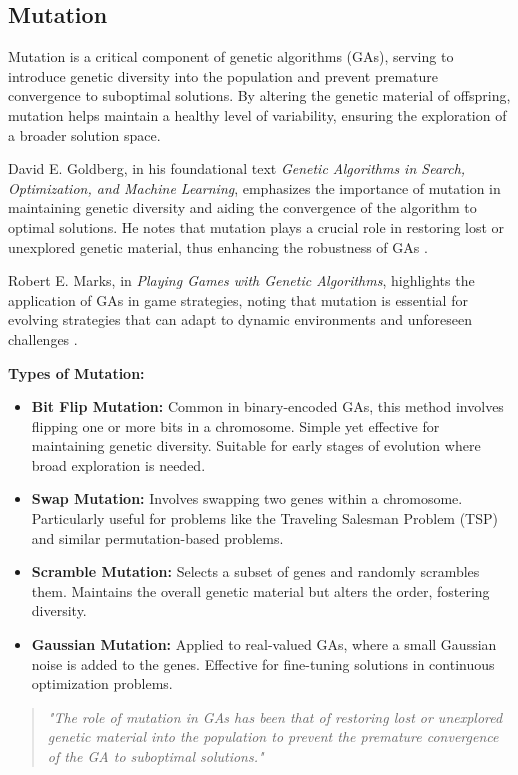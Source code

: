 \documentclass[a4paper, twocolumn]{article}
\begin{document}
\subsection{Mutation\label{sec:Mutation}}

Mutation is a critical component of genetic algorithms (GAs), serving to introduce genetic diversity into the population and prevent premature convergence to suboptimal solutions. By altering the genetic material of offspring, mutation helps maintain a healthy level of variability, ensuring the exploration of a broader solution space.

David E. Goldberg, in his foundational text \textit{Genetic Algorithms in Search, Optimization, and Machine Learning}, emphasizes the importance of mutation in maintaining genetic diversity and aiding the convergence of the algorithm to optimal solutions. He notes that mutation plays a crucial role in restoring lost or unexplored genetic material, thus enhancing the robustness of GAs \cite{goldberg1989genetic}.

Robert E. Marks, in \textit{Playing Games with Genetic Algorithms}, highlights the application of GAs in game strategies, noting that mutation is essential for evolving strategies that can adapt to dynamic environments and unforeseen challenges \cite{marks2001playing}.

\textbf{Types of Mutation:}
\begin{itemize}
    \item \textbf{Bit Flip Mutation:} Common in binary-encoded GAs, this method involves flipping one or more bits in a chromosome. Simple yet effective for maintaining genetic diversity. Suitable for early stages of evolution where broad exploration is needed.
    \item \textbf{Swap Mutation:} Involves swapping two genes within a chromosome. Particularly useful for problems like the Traveling Salesman Problem (TSP) and similar permutation-based problems.
    \item \textbf{Scramble Mutation:} Selects a subset of genes and randomly scrambles them. Maintains the overall genetic material but alters the order, fostering diversity.
    \item \textbf{Gaussian Mutation:} Applied to real-valued GAs, where a small Gaussian noise is added to the genes. Effective for fine-tuning solutions in continuous optimization problems.
\end{itemize}

\begin{quote}
\emph{"The role of mutation in GAs has been that of restoring lost or unexplored genetic material into the population to prevent the premature convergence of the GA to suboptimal solutions."} \cite{srinvas1994adaptive}
\end{quote}
\end{document}
